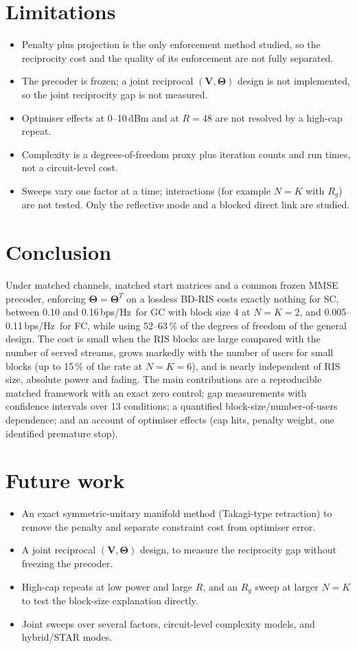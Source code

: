 \documentclass[10pt,a4paper]{article}
\newcommand{\bpsHz}{bps/Hz}
\newcommand{\THT}{\boldsymbol{\Theta}}
\begin{document}
\section{Limitations}
\begin{itemize}
\item Penalty plus projection is the only enforcement method studied, so the reciprocity cost and the quality of its enforcement are not fully separated.
\item The precoder is frozen; a joint reciprocal $(\mathbf V,\THT)$ design is not implemented, so the joint reciprocity gap is not measured.
\item Optimiser effects at 0--10\,dBm and at $R{=}48$ are not resolved by a high-cap repeat.
\item Complexity is a degrees-of-freedom proxy plus iteration counts and run times, not a circuit-level cost.
\item Sweeps vary one factor at a time; interactions (for example $N{=}K$ with $R_g$) are not tested. Only the reflective mode and a blocked direct link are studied.
\end{itemize}

\section{Conclusion}
Under matched channels, matched start matrices and a common frozen MMSE precoder, enforcing $\THT=\THT^T$ on a lossless BD-RIS costs exactly nothing for SC, between 0.10 and 0.16\,\bpsHz\ for GC with block size 4 at $N{=}K{=}2$, and 0.005--0.11\,\bpsHz\ for FC, while using 52--63\,\% of the degrees of freedom of the general design. The cost is small when the RIS blocks are large compared with the number of served streams, grows markedly with the number of users for small blocks (up to 15\,\% of the rate at $N{=}K{=}6$), and is nearly independent of RIS size, absolute power and fading. The main contributions are a reproducible matched framework with an exact zero control; gap measurements with confidence intervals over 13 conditions; a quantified block-size/number-of-users dependence; and an account of optimiser effects (cap hits, penalty weight, one identified premature stop).

\section{Future work}
\begin{itemize}
\item An exact symmetric-unitary manifold method (Takagi-type retraction) to remove the penalty and separate constraint cost from optimiser error.
\item A joint reciprocal $(\mathbf V,\THT)$ design, to measure the reciprocity gap without freezing the precoder.
\item High-cap repeats at low power and large $R$, and an $R_g$ sweep at larger $N{=}K$ to test the block-size explanation directly.
\item Joint sweeps over several factors, circuit-level complexity models, and hybrid/STAR modes.
\end{itemize}
\end{document}
